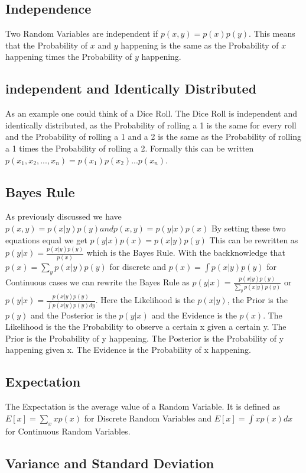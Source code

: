 \documentclass[a4paper]{article}
\begin{document}
\subsection{Independence}
Two Random Variables are independent if $p(x,y) = p(x) p(y)$. This means that the Probability of $x$ and $y$ happening is the same as the Probability of $x$ happening times the Probability of $y$ happening.

\subsection{independent and Identically Distributed}
As an example one could think of a Dice Roll. The Dice Roll is independent and identically distributed, as the Probability of rolling a 1 is the same for every roll and the Probability of rolling a 1 and a 2 is the same as the Probability of rolling a 1 times the Probability of rolling a 2.
Formally this can be written $p(x_1, x_2, ..., x_n) = p(x_1) p(x_2) ... p(x_n).$

\subsection{Bayes Rule}
As previously discussed we have $ p(x,y) = p(x|y)p(y) and p(x,y) = p(y|x)p(x)$
By setting these two equations equal we get $p(y|x)p(x) = p(x|y)p(y)$
This can be rewritten as $p(y|x) = \frac{p(x|y)p(y)}{p(x)}$ which is the Bayes Rule.
With the backknowledge that $p(x) = \sum_{y} p(x|y)p(y)$ for discrete  and $p(x) = \int p(x|y)p(y) $ for Continuous cases  we can rewrite the Bayes Rule as $p(y|x) = \frac{p(x|y)p(y)}{\sum_{y} p(x|y)p(y)}$ or $p(y|x) = \frac{p(x|y)p(y)}{\int p(x|y)p(y) dy}$.
Here the Likelihood is the $p(x|y)$, the Prior is the $p(y)$ and the Posterior is the $p(y|x)$ and the Evidence is the $p(x)$. The Likelihood is the the Probability to observe a certain x given a certain y. The Prior is the Probability of y happening. The Posterior is the Probability of y happening given x. The Evidence is the Probability of x happening.

\subsection{Expectation}
The Expectation is the average value of a Random Variable. It is defined as $E[x] = \sum_{x} x p(x)$ for Discrete Random Variables and $E[x] = \int x p(x) dx$ for Continuous Random Variables.

\subsection{Variance and Standard Deviation}
\end{document}
